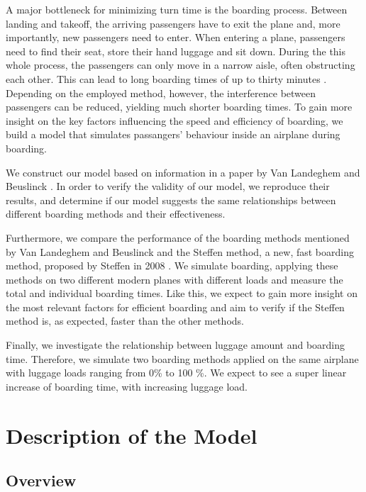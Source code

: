 \documentclass[11pt]{article}
\begin{document}
A major bottleneck for minimizing turn time is the boarding process. Between landing and takeoff, the arriving passengers have to exit the plane and, more importantly, new passengers need to enter. When entering a plane, passengers need to find their seat, store their hand luggage and sit down. During the this whole process, the passengers can only move in a narrow aisle, often obstructing each other. This can lead to long boarding times of up to thirty minutes \cite{beus}. Depending on the employed method, however, the interference between passengers can be reduced, yielding much shorter boarding times. To gain more insight on the key factors influencing the speed and efficiency of boarding, we build a model that simulates passangers' behaviour inside an airplane during boarding.

We construct our model based on information in a paper by Van Landeghem and Beuslinck \cite{beus}. In order to verify the validity of our model, we reproduce their results, and determine if our model suggests the same relationships between different boarding methods and their effectiveness.

Furthermore, we compare the performance of the boarding methods mentioned by Van Landeghem and Beuslinck and the Steffen method, a new, fast boarding method, proposed by Steffen in 2008 \cite{beus}\cite{steffen}. We simulate boarding, applying these methods on two different modern planes with different loads and measure the total and individual boarding times. Like this, we expect to gain more insight on the most relevant factors for efficient boarding and aim to verify if the Steffen method is, as expected, faster than the other methods.

Finally, we investigate the relationship between luggage amount and boarding time. Therefore, we simulate two boarding methods applied on the same airplane with luggage loads ranging from 0\% to 100 \%. We expect to see a super linear increase of boarding time, with increasing luggage load.










\section{Description of the Model}

\subsection{Overview}
\end{document}
